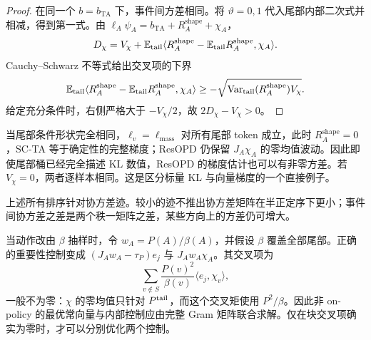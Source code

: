 \begin{proof}
在同一个 $b=b_{\mathrm{TA}}$ 下，事件间方差相同。将 $\vartheta=0,1$ 代入尾部内部二次式并相减，得到第一式。由 $\ell_A\psi_A=b_{\mathrm{TA}}+R_A^{\mathrm{shape}}+\chi_A$，
\begin{equation*}
 D_\chi=V_\chi+\mathbb E_{\mathrm{tail}}\langle R_A^{\mathrm{shape}}-\mathbb E_{\mathrm{tail}}R_A^{\mathrm{shape}},\chi_A\rangle.
\end{equation*}
Cauchy--Schwarz 不等式给出交叉项的下界
\begin{equation*}
 \mathbb E_{\mathrm{tail}}\langle R_A^{\mathrm{shape}}-\mathbb E_{\mathrm{tail}}R_A^{\mathrm{shape}},\chi_A\rangle
 \geq-\sqrt{\operatorname{Var}_{\mathrm{tail}}(R_A^{\mathrm{shape}})V_\chi}.
\end{equation*}
给定充分条件时，右侧严格大于 $-V_\chi/2$，故 $2D_\chi-V_\chi>0$。
\end{proof}

当尾部条件形状完全相同，$\ell_v=\ell_{\mathrm{mass}}$ 对所有尾部 token 成立，此时 $R_A^{\mathrm{shape}}=0$，SC-TA 等于确定性的完整梯度；ResOPD 仍保留 $J_A\chi_A$ 的零均值波动。因此即使尾部桶已经完全描述 KL 数值，ResOPD 的梯度估计也可以有非零方差。若 $V_\chi=0$，两者逐样本相同。这是区分标量 KL 与向量梯度的一个直接例子。

上述所有排序针对协方差迹。较小的迹不推出协方差矩阵在半正定序下更小；事件间协方差之差是两个秩一矩阵之差，某些方向上的方差仍可增大。

当动作改由 $\beta$ 抽样时，令 $w_A=P(A)/\beta(A)$，并假设 $\beta$ 覆盖全部尾部。正确的重要性控制变成 $(J_Aw_A-\tau_P)e_j$ 与 $J_Aw_A\chi_A$。其交叉项为
\begin{equation*}
 \sum_{v\notin S}\frac{P(v)^2}{\beta(v)}\langle e_j,\chi_v\rangle,
\end{equation*}
一般不为零：$\chi$ 的零均值只针对 $P^{\mathrm{tail}}$，而这个交叉矩使用 $P^2/\beta$。因此非 on-policy 的最优常向量与内部控制应由完整 Gram 矩阵联合求解。仅在块交叉项确实为零时，才可以分别优化两个控制。
